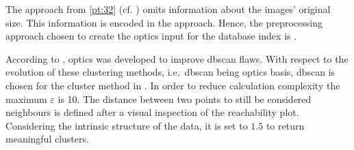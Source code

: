 The approach from \autoref{pt:32} (cf. \cite{OPTICS1999}) omits information about the images' original size. 
This information is encoded in the \eigendocs{} approach.
Hence, the preprocessing approach chosen to create the \ac{optics} input for the \databaseName{} database index is \eigendocs{}. 

According to \citeauthor{OPTICS2014}, \ac{optics} was developed to improve \ac{dbscan} flaws.
With respect to the evolution of these clustering methods, i.e.\ \ac{dbscan} being \ac{optics} basis, 
\ac{dbscan} is chosen for the cluster method in .
In order to reduce calculation complexity the maximum $\varepsilon$ is 10.
The distance between two points to still be considered neighbours is defined after a visual inspection of the reachability plot.
Considering the intrinsic structure of the \eigendocs{} data, it is set to $1.5$ to return meaningful clusters.